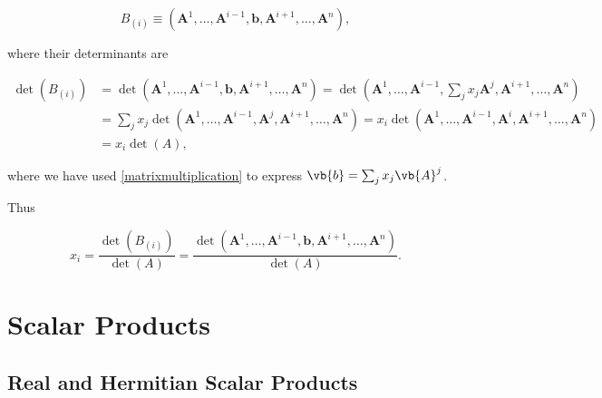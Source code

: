 \documentclass[a4paper,12pt]{report}
\begin{document}
\begin{equation}
B_{(i)} \equiv  (\mathbf{A}^1, \ldots, \mathbf{A}^{i-1}, \mathbf{b}, \mathbf{A}^{i+1}, \ldots, \mathbf{A}^n), 
\end{equation}

where their determinants are

\begin{equation}
\begin{aligned}
\det(B_{(i)}) &= \det(\mathbf{A}^1, \ldots, \mathbf{A}^{i-1}, \mathbf{b}, \mathbf{A}^{i+1}, \ldots, \mathbf{A}^n) = \det(\mathbf{A}^1, \ldots, \mathbf{A}^{i-1}, \sum_{j} x_j \mathbf{A}^j, \mathbf{A}^{i+1}, \ldots, \mathbf{A}^n) \\
&= \sum_{j} x_j \det(\mathbf{A}^1, \ldots, \mathbf{A}^{i-1}, \mathbf{A}^j, \mathbf{A}^{i+1}, \ldots, \mathbf{A}^n) = x_i \det(\mathbf{A}^1, \ldots, \mathbf{A}^{i-1}, \mathbf{A}^i, \mathbf{A}^{i+1}, \ldots, \mathbf{A}^n) \\
&= x_i \det(A),
\end{aligned}
\end{equation}

where we have used \cref{matrixmultiplication} to express \(\vb{b}  = \sum_{j}^{} x_{j}\vb{A} ^{j}  \).  

Thus

\begin{equation}
x_i = \frac{\det(B_{(i)})}{\det(A)} = \frac{\det(\mathbf{A}^1, \ldots, \mathbf{A}^{i-1}, \mathbf{b}, \mathbf{A}^{i+1}, \ldots, \mathbf{A}^n)}{\det(A)} .
\end{equation}









\chapter{Scalar Products}

\section{Real and Hermitian Scalar Products}
\end{document}
